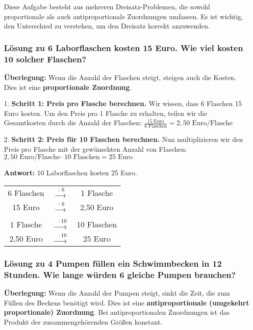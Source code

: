 \begin{loesungsumgebung}[loes:2.3]{} %
Diese Aufgabe besteht aus mehreren Dreisatz-Problemen, die sowohl proportionale als auch antiproportionale Zuordnungen umfassen. Es ist wichtig, den Unterschied zu verstehen, um den Dreisatz korrekt anzuwenden.

\subsubsection*{Lösung zu 6 Laborflaschen kosten 15 Euro. Wie viel kosten 10 solcher Flaschen?}

\textbf{Überlegung:} Wenn die Anzahl der Flaschen steigt, steigen auch die Kosten. Dies ist eine \textbf{proportionale Zuordnung}.

1.  \textbf{Schritt 1: Preis pro Flasche berechnen.}
    Wir wissen, dass 6 Flaschen 15 Euro kosten. Um den Preis pro 1 Flasche zu erhalten, teilen wir die Gesamtkosten durch die Anzahl der Flaschen:
    $\frac{15 \text{ Euro}}{6 \text{ Flaschen}} = 2,50 \text{ Euro/Flasche}$

2.  \textbf{Schritt 2: Preis für 10 Flaschen berechnen.}
    Nun multiplizieren wir den Preis pro Flasche mit der gewünschten Anzahl von Flaschen:
    $2,50 \text{ Euro/Flasche} \cdot 10 \text{ Flaschen} = 25 \text{ Euro}$

\textbf{Antwort:} 10 Laborflaschen kosten 25 Euro.

\begin{center}
\begin{tabular}{c c c}
    6 Flaschen & $\xrightarrow{\text{ : } 6}$ & 1 Flasche \\
    15 Euro & $\xrightarrow{\text{ : } 6}$ & 2,50 Euro \\
    \quad \\
    1 Flasche & $\xrightarrow{\text{ } \cdot 10}$ & 10 Flaschen \\
    2,50 Euro & $\xrightarrow{\text{ } \cdot 10}$ & 25 Euro \\
\end{tabular}
\end{center}

\subsubsection*{Lösung zu 4 Pumpen füllen ein Schwimmbecken in 12 Stunden. Wie lange würden 6 gleiche Pumpen brauchen?}

\textbf{Überlegung:} Wenn die Anzahl der Pumpen steigt, sinkt die Zeit, die zum Füllen des Beckens benötigt wird. Dies ist eine \textbf{antiproportionale (umgekehrt proportionale) Zuordnung}. Bei antiproportionalen Zuordnungen ist das Produkt der zusammengehörenden Größen konstant.


\end{loesungsumgebung}

